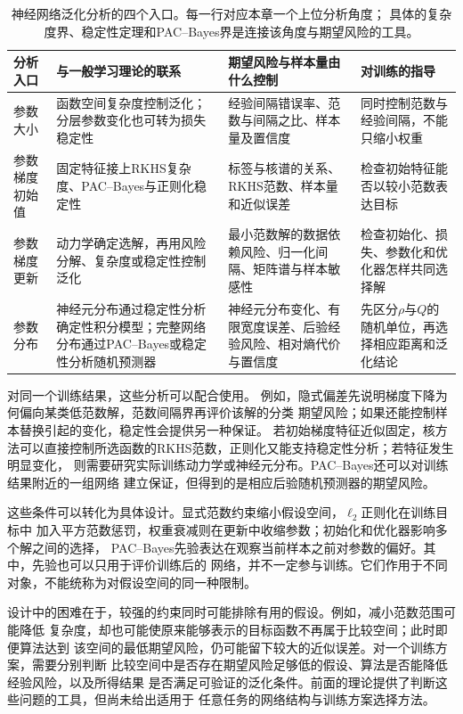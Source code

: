 \begin{table}[!htb]
 \centering
 \small
 \begin{tabular}{p{24mm}p{43mm}p{46mm}p{38mm}}
 \toprule
 分析入口 & 与一般学习理论的联系 & 期望风险与样本量由什么控制 & 对训练的指导\\
 \midrule
 参数大小 & 函数空间复杂度控制泛化；分层参数变化也可转为损失稳定性 & 经验间隔错误率、范数与间隔之比、样本量及置信度 & 同时控制范数与经验间隔，不能只缩小权重\\
 参数梯度初始值 & 固定特征接上RKHS复杂度、PAC--Bayes与正则化稳定性 & 标签与核谱的关系、RKHS范数、样本量和近似误差 & 检查初始特征能否以较小范数表达目标\\
 参数梯度更新 & 动力学确定选解，再用风险分解、复杂度或稳定性控制泛化 & 最小范数解的数据依赖风险、归一化间隔、矩阵谱与样本敏感性 & 检查初始化、损失、参数化和优化器怎样共同选择解\\
 参数分布 & 神经元分布通过稳定性分析确定性积分模型；完整网络分布通过PAC--Bayes或稳定性分析随机预测器 & 神经元分布变化、有限宽度误差、后验经验风险、相对熵代价与置信度 & 先区分$\rho$与$Q$的随机单位，再选择相应距离和泛化结论\\
 \bottomrule
 \end{tabular}
 \caption{神经网络泛化分析的四个入口。每一行对应本章一个上位分析角度；
 具体的复杂度界、稳定性定理和PAC--Bayes界是连接该角度与期望风险的工具。}
 \label{tab:deep-generalization-routes}
\end{table}

对同一个训练结果，这些分析可以配合使用。
例如，隐式偏差先说明梯度下降为何偏向某类低范数解，范数间隔界再评价该解的分类
期望风险；如果还能控制样本替换引起的变化，稳定性会提供另一种保证。
若初始梯度特征近似固定，核方法可以直接控制所选函数的RKHS范数，正则化又能支持稳定性分析；若特征发生明显变化，
则需要研究实际训练动力学或神经元分布。PAC--Bayes还可以对训练结果附近的一组网络
建立保证，但得到的是相应后验随机预测器的期望风险。

这些条件可以转化为具体设计。显式范数约束缩小假设空间，$\ell_2$正则化在训练目标中
加入平方范数惩罚，权重衰减则在更新中收缩参数；初始化和优化器影响多个解之间的选择，
PAC--Bayes先验表达在观察当前样本之前对参数的偏好。其中，先验也可以只用于评价训练后的
网络，并不一定参与训练。它们作用于不同对象，不能统称为对假设空间的同一种限制。

设计中的困难在于，较强的约束同时可能排除有用的假设。例如，减小范数范围可能降低
复杂度，却也可能使原来能够表示的目标函数不再属于比较空间；此时即便算法达到
该空间的最低期望风险，仍可能留下较大的近似误差。对一个训练方案，需要分别判断
比较空间中是否存在期望风险足够低的假设、算法是否能降低经验风险，以及所得结果
是否满足可验证的泛化条件。前面的理论提供了判断这些问题的工具，但尚未给出适用于
任意任务的网络结构与训练方案选择方法。

